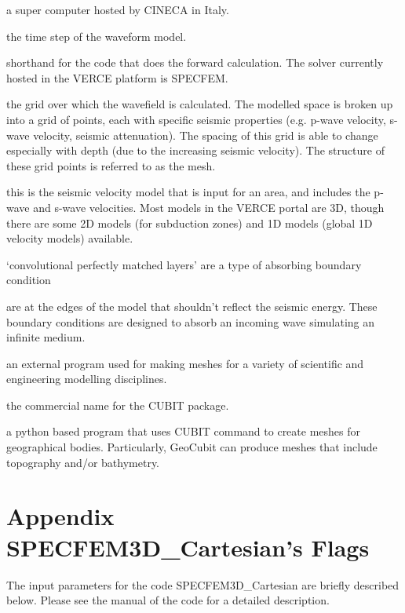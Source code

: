 \documentclass[english]{book}
\begin{document}
 \textendash{} a super computer hosted by CINECA in Italy.

 \textendash{} the time step of the waveform model.

 \textendash{} shorthand for the code that does the forward calculation.
The solver currently hosted in the VERCE platform is SPECFEM.

 \textendash{} the grid over which the wavefield is calculated. The modelled
space is broken up into a grid of points, each with specific seismic
properties (e.g. p-wave velocity, s-wave velocity, seismic attenuation).
The spacing of this grid is able to change especially with depth (due to
the increasing seismic velocity). The structure of these grid points is
referred to as the mesh.

 \textendash{} this is the seismic velocity model that is input
for an area, and includes the p-wave and s-wave velocities. Most models
in the VERCE portal are 3D, though there are some 2D models (for
subduction zones) and 1D models (global 1D velocity models) available.

 \textendash{} ‘convolutional perfectly matched layers’ are a type of
absorbing boundary condition

 \textendash{} are at the edges of the model that
shouldn’t reflect the seismic energy. These boundary conditions are
designed to absorb an incoming wave simulating an infinite medium.

 \textendash{} an external program used for making meshes for a variety of
scientific and engineering modelling disciplines.

 \textendash{} the commercial name for the CUBIT package.

 \textendash{} a python based program that uses CUBIT command to create
meshes for geographical bodies. Particularly, GeoCubit can produce
meshes that include topography and/or bathymetry.


\chapter{Appendix  \textendash{} SPECFEM3D\_Cartesian’s Flags}
\label{\detokenize{Appendix1::doc}}\label{\detokenize{Appendix1:appendix-1-specfem3d-cartesians-flags}}
The input parameters for the code SPECFEM3D\_Cartesian are briefly
described below. Please see the manual of the code for a detailed
description.
\end{document}
